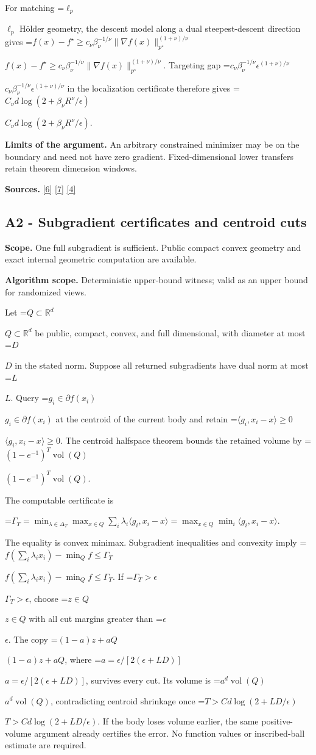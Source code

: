 \documentclass[10pt,a4paper]{article}
\newcommand{\AtlasMath}[1]{\par\begingroup\centering\setbox0=\hbox{$\displaystyle #1$}\ifdim\wd0>1.4\linewidth\typeout{ATLAS WIDE FORMULA: \the\wd0}\fi\ifdim\wd0>\linewidth\resizebox{\linewidth}{!}{\box0}\else\box0\fi\par\endgroup}
\newcommand{\AtlasInlineMath}[1]{\begingroup\setbox0=\hbox{$#1$}\ifdim\wd0>.4\linewidth\endgroup\AtlasMath{#1}\else\endgroup$#1$\fi}
\begin{document}
For matching \AtlasInlineMath{\ell_p} Hölder geometry, the descent model along a dual steepest-descent direction gives
\AtlasInlineMath{f(x)-f^\star\ge c_\nu\beta_\nu^{-1/\nu}\|\nabla f(x)\|_{p^\star}^{(1+\nu)/\nu}}.
Targeting gap \AtlasInlineMath{c_\nu\beta_\nu^{-1/\nu}\epsilon^{(1+\nu)/\nu}} in the localization certificate therefore gives
\AtlasInlineMath{C_\nu d\log(2+\beta_\nu R^\nu/\epsilon)}.

\textbf{Limits of the argument.} An arbitrary constrained minimizer may be on the boundary and need not have zero gradient. Fixed-dimensional lower transfers retain theorem dimension windows.

\textbf{Sources.} \href{https://arxiv.org/pdf/2101.09740v2}{[6]} \href{https://arxiv.org/pdf/2609.33360v2}{[7]} \href{https://arxiv.org/pdf/2609.10874}{[4]}

\subsection{A2 - Subgradient certificates and centroid cuts}
\textbf{Scope.} One full subgradient is sufficient. Public compact convex geometry and exact internal geometric computation are available.

\textbf{Algorithm scope.} Deterministic upper-bound witness; valid as an upper bound for randomized views.

Let \AtlasInlineMath{Q\subset\mathbb R^d} be public, compact, convex, and full dimensional, with diameter at most \AtlasInlineMath{D} in the stated norm. Suppose all returned subgradients have dual norm at most \AtlasInlineMath{L}. Query \AtlasInlineMath{g_i\in\partial f(x_i)} at the centroid of the current body and retain \AtlasInlineMath{\langle g_i,x_i-x\rangle\ge0}. The centroid halfspace theorem bounds the retained volume by \AtlasInlineMath{(1-e^{-1})^T\operatorname{vol}(Q)}.

The computable certificate is

\AtlasMath{\Gamma_T=\min_{\lambda\in\Delta_T}\max_{x\in Q}\sum_i\lambda_i\langle g_i,x_i-x\rangle
=\max_{x\in Q}\min_i\langle g_i,x_i-x\rangle.}

The equality is convex minimax. Subgradient inequalities and convexity imply
\AtlasInlineMath{f(\sum_i\lambda_ix_i)-\min_Qf\le\Gamma_T}.
If \AtlasInlineMath{\Gamma_T>\epsilon}, choose \AtlasInlineMath{z\in Q} with all cut margins greater than \AtlasInlineMath{\epsilon}. The copy \AtlasInlineMath{(1-a)z+aQ}, where \AtlasInlineMath{a=\epsilon/[2(\epsilon+LD)]}, survives every cut. Its volume is \AtlasInlineMath{a^d\operatorname{vol}(Q)}, contradicting centroid shrinkage once \AtlasInlineMath{T>C d\log(2+LD/\epsilon)}. If the body loses volume earlier, the same positive-volume argument already certifies the error. No function values or inscribed-ball estimate are required.
\end{document}
